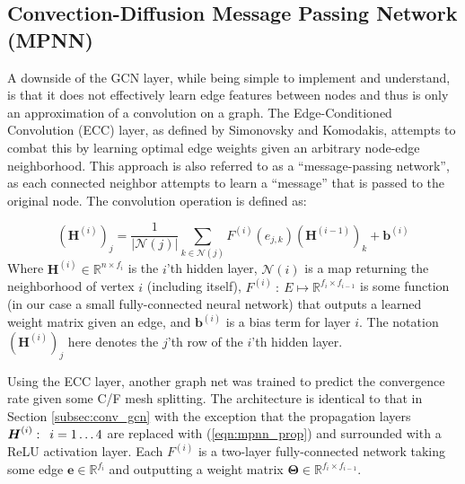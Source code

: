\documentclass[review]{siamart190516}
\newcommand{\abs}[1]{\left\lvert#1\right\rvert}
\newcommand{\mat}[1]{\bm{{#1}}}
\renewcommand{\vec}[1]{\bm{{#1}}}
\newcommand{\hquad}{\enskip}
\begin{document}
\subsection{Convection-Diffusion Message Passing Network (MPNN)}\label{subsec:conv_mpnn}
A downside of the GCN layer, while being simple to implement and understand, is that it does not effectively learn edge features between nodes and thus is only an approximation of a convolution on a graph.  The Edge-Conditioned Convolution (ECC) layer, as defined by Simonovsky and Komodakis\cite{ecc}, attempts to combat this by learning optimal edge weights given an arbitrary node-edge neighborhood.  This approach is also referred to as a ``message-passing network'', as each connected neighbor attempts to learn a ``message'' that is passed to the original node.\cite{mpnn}  The convolution operation is defined as:

\begin{equation}\label{eqn:mpnn_prop}
  \left(\mat{H}^{(i)}\right)_j = \frac{1}{\abs{\mathcal{N}\left(j\right)}} \sum_{k\in\mathcal{N}\left(j\right)} F^{(i)}\left(e_{j,k}\right)\left(\mat{H}^{(i-1)}\right)_k + \vec{b}^{(i)}
\end{equation}
Where $\mat{H}^{\left(i\right)} \in \mathbb{R}^{n \times f_i}$ is the $i$'th hidden layer, $\mathcal{N}\left(i\right)$ is a map returning the neighborhood of vertex $i$ (including itself), $F^{(i)} \: : \: E \mapsto \mathbb{R}^{f_i \times f_{i-1}}$ is some function (in our case a small fully-connected neural network) that outputs a learned weight matrix given an edge, and $\vec{b}^{(i)}$ is a bias term for layer $i$.  The notation $\left(\mat{H}^{\left(i\right)}\right)_j$ here denotes the $j$'th row of the $i$'th hidden layer.

Using the ECC layer, another graph net was trained to predict the convergence rate given some C/F mesh splitting.  The architecture is identical to that in Section \ref{subsec:conv_gcn} with the exception that the propagation layers $\mat{H}^{(i)}: \hquad i=1\ldots 4$ are replaced with (\ref{eqn:mpnn_prop}) and surrounded with a ReLU activation layer.  Each $F^{(i)}$ is a two-layer fully-connected network taking some edge $\vec{e} \in \mathbb{R}^{f_i}$ and outputting a weight matrix $\mat{\Theta} \in \mathbb{R}^{f_i\times f_{i-1}}$.

\end{document}
